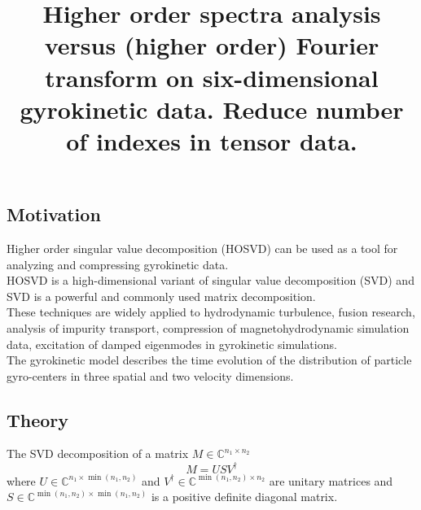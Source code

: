 \documentclass[GeometricDeepLearning/sections/Kurdyukova2021Lab8/main.tex]{subfiles}
\begin{document}
\title{Higher order spectra analysis versus (higher order) Fourier transform on six-dimensional gyrokinetic data. Reduce number of indexes in tensor data.}

\subsection{Motivation}
Higher order singular value decomposition (HOSVD) can be used as a tool for analyzing and compressing gyrokinetic data.\\ 
HOSVD is a high-dimensional variant of singular value decomposition (SVD) and SVD is a powerful and commonly used matrix decomposition.\\
These techniques are widely applied to hydrodynamic turbulence, fusion research, analysis of impurity transport, compression of magnetohydrodynamic simulation data, excitation of damped eigenmodes in gyrokinetic simulations.\\
The gyrokinetic model describes the time evolution of the distribution of particle gyro-centers in three spatial and
two velocity dimensions.







\subsection{Theory}

The SVD decomposition of a matrix $M \in \mathbb{C}^{n_1\times n_2}$
    \[  M = USV^{\dag} \]
where $U \in \mathbb{C}^{n_1\times\min(n_1, n_2)}$ and $V^{\dag} \in \mathbb{C}^{\min(n_1, n_2)\times n_2}$ are unitary matrices and $S \in \mathbb{C}^{\min(n_1, n_2)\times \min(n_1, n_2)}$ is a positive definite diagonal matrix.

\end{document}
